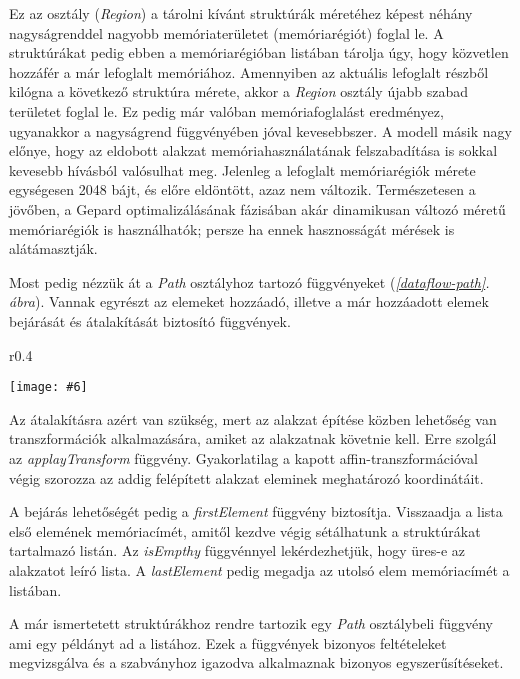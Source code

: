 \documentclass[12pt]{report}
\makeatletter
\theoremstyle{definition}
\newcommand{\func}[1]{{\textsl{#1}}}
\newcommand{\melyikoldalra}{r}
\newlength{\Xoffset}
\newlength{\Yoffset}
\newcommand*{\setpdfoffset}[2]{%
  \setlength{\Xoffset}{#1}%
  \setlength{\Yoffset}{#2}%
}
\newcommand*{\setviewport}[4]{%
  \def\x@viewport{%
    {\the\dimexpr#1-\Xoffset}
    {\the\dimexpr#2-\Yoffset}
    {\the\dimexpr#3-\Xoffset}
    {\the\dimexpr#4-\Yoffset}%
  }%
}
\newcommand{\includegraphicskivagas}[6]{
    \setpdfoffset{0pt}{0pt}
    \setviewport{#1}{#2}{#3}{#4}
    \texttt{[image: \#6]}
}
\newcommand{\includedataflowkivagas}[5]{
    \includegraphicskivagas{#1}{#2}{#3}{#4}{scale=0.6,#5}
    {img/built/dataflow_eps}
}
\makeatother
\begin{document}
Ez az osztály (\func{Region}) a tárolni kívánt struktúrák méretéhez képest
néhány nagyságrenddel nagyobb memóriaterületet (memóriarégiót) foglal le. A
struktúrákat pedig ebben a memóriarégióban listában tárolja úgy, hogy közvetlen
hozzáfér a már lefoglalt memóriához. Amennyiben az aktuális lefoglalt részből
kilógna a következő struktúra mérete, akkor a \func{Region} osztály újabb
szabad területet foglal le. Ez pedig már valóban memóriafoglalást eredményez,
ugyanakkor a nagyságrend függvényében jóval kevesebbszer. A modell másik nagy
előnye, hogy az eldobott alakzat memóriahasználatának felszabadítása is sokkal
kevesebb hívásból valósulhat meg. Jelenleg a lefoglalt memóriarégiók mérete
egységesen 2048 bájt, és előre eldöntött, azaz nem változik. Természetesen a
jövőben, a Gepard optimalizálásának fázisában akár dinamikusan változó méretű
memóriarégiók is használhatók; persze ha ennek hasznosságát mérések is
alátámasztják.

Most pedig nézzük át a \func{Path} osztályhoz tartozó függvényeket
(\emph{\ref{dataflow-path}. ábra}). Vannak egyrészt az elemeket
hozzáadó, illetve a már hozzáadott elemek bejárását és átalakítását biztosító
függvények.

  \begin{wrapfigure}{\melyikoldalra}{0.4\textwidth}
    \begin{center}
      \includedataflowkivagas{153pt}{355pt}{345pt}{595pt}{}
    \end{center}
    \caption{\label{dataflow-path} A belső Path API részei. \\ (Részlet a
    \emph{\ref{dataflow}. folyamatábrából}.)}
  \end{wrapfigure}

Az átalakításra azért van szükség, mert az alakzat építése közben lehetőség van
transzformációk alkalmazására, amiket az alakzatnak követnie kell. Erre szolgál
az \func{applayTransform} függvény. Gyakorlatilag a kapott
affin-transzformációval végig szorozza az addig felépített alakzat eleminek
meghatározó koordinátáit.

A bejárás lehetőségét pedig a \func{firstElement} függvény biztosítja.
Visszaadja a lista első elemének memóriacímét, amitől kezdve végig sétálhatunk
a struktúrákat tartalmazó listán. Az \func{isEmpthy} függvénnyel
lekérdezhetjük, hogy üres-e az alakzatot leíró lista. A \func{lastElement}
pedig megadja az utolsó elem memóriacímét a listában.

A már ismertetett struktúrákhoz rendre tartozik egy \func{Path} osztálybeli
függvény ami egy példányt ad a listához. Ezek a függvények bizonyos
feltételeket megvizsgálva és a szabványhoz igazodva alkalmaznak bizonyos
egyszerűsítéseket.
\end{document}
